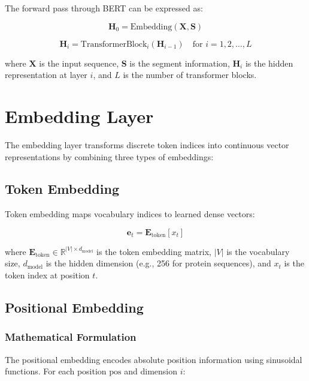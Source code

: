 \documentclass[11pt,a4paper]{article}
\begin{document}
\noindent The forward pass through BERT can be expressed as:

\begin{equation}
\mathbf{H}_0 = \text{Embedding}(\mathbf{X}, \mathbf{S})
\end{equation}

\begin{equation}
\mathbf{H}_{i} = \text{TransformerBlock}_i(\mathbf{H}_{i-1}) \quad \text{for } i = 1, 2, \ldots, L
\end{equation}

where $\mathbf{X}$ is the input sequence, $\mathbf{S}$ is the segment information, $\mathbf{H}_i$ is the hidden representation at layer $i$, and $L$ is the number of transformer blocks.

\section{Embedding Layer}

The embedding layer transforms discrete token indices into continuous vector representations by combining three types of embeddings:

\subsection{Token Embedding}

Token embedding maps vocabulary indices to learned dense vectors:

\begin{equation}
\mathbf{e}_t = \mathbf{E}_{\text{token}}[x_t]
\end{equation}

where $\mathbf{E}_{\text{token}} \in \mathbb{R}^{|V| \times d_{\text{model}}}$ is the token embedding matrix, $|V|$ is the vocabulary size, $d_{\text{model}}$ is the hidden dimension (e.g., 256 for protein sequences), and $x_t$ is the token index at position $t$.

\subsection{Positional Embedding}

\subsubsection{Mathematical Formulation}

The positional embedding encodes absolute position information using sinusoidal functions. For each position $\text{pos}$ and dimension $i$:
\end{document}
